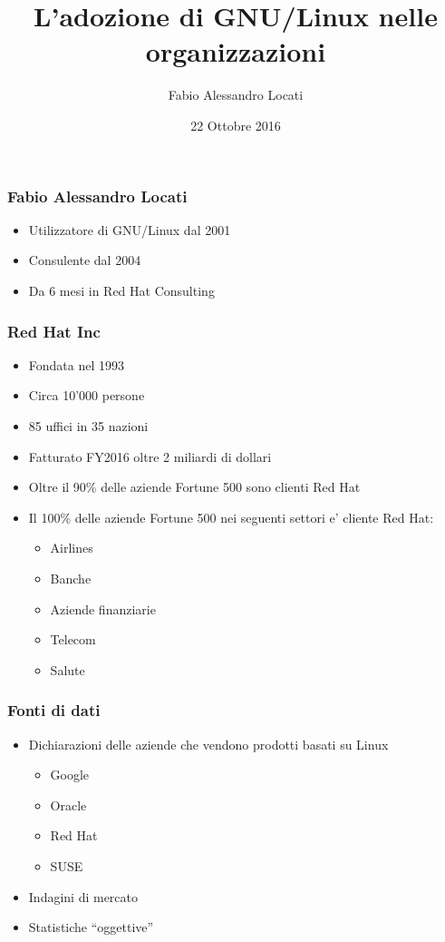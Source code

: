 \documentclass[t,aspectratio=169]{beamer}
\title{L'adozione di GNU/Linux nelle organizzazioni}
\author{Fabio Alessandro Locati}
\date{22 Ottobre 2016}
\institute{Senior Cloud Consultant}
\begin{document}
\maketitle

\begin{frame}
    \frametitle{Fabio Alessandro Locati}
    \begin{itemize}
        \item<2-> Utilizzatore di GNU/Linux dal 2001
        \item<3-> Consulente dal 2004
        \item<4-> Da 6 mesi in Red Hat Consulting
    \end{itemize}
\end{frame}

\begin{frame}
    \frametitle{Red Hat Inc}
    \begin{itemize}
        \item<2-> Fondata nel 1993
        \item<3-> Circa 10'000 persone
        \item<4-> 85 uffici in 35 nazioni
        \item<5-> Fatturato FY2016 oltre 2 miliardi di dollari
        \item<6-> Oltre il 90\% delle aziende Fortune 500 sono clienti Red Hat
        \item<7-> Il 100\% delle aziende Fortune 500 nei seguenti settori e' cliente Red Hat:
        \begin{itemize}
            \item<7-> Airlines
            \item<7-> Banche
            \item<7-> Aziende finanziarie
            \item<7-> Telecom
            \item<7-> Salute
        \end{itemize}
    \end{itemize}
\end{frame}

\begin{frame}
    \frametitle{Fonti di dati}
    \begin{itemize}
        \item<2-> Dichiarazioni delle aziende che vendono prodotti basati su Linux
        \begin{itemize}
            \item<2-> Google 
            \item<2-> Oracle
            \item<2-> Red Hat
            \item<2-> SUSE
        \end{itemize}
        \item<4-> Indagini di mercato
        \item<5-> Statistiche ``oggettive''
    \end{itemize}
\end{frame}
\end{document}
